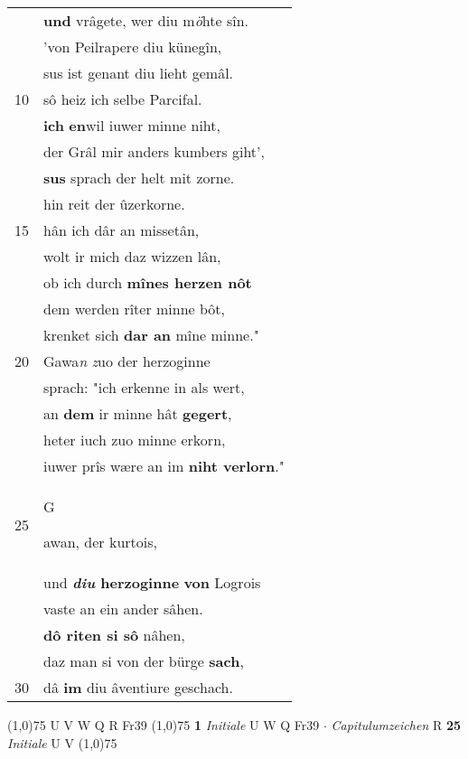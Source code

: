 \documentclass[8pt,a4paper,notitlepage]{article}
\begin{document}
\begin{table}[ht]
\begin{minipage}[t]{0.5\linewidth}
\begin{tabular}{rl}
 & \textbf{und} vrâgete, wer diu m\textit{ö}hte sîn.\\ 
 & 'von Peilrapere diu künegîn,\\ 
 & sus ist genant diu lieht gemâl.\\ 
10 & sô heiz ich selbe Parcifal.\\ 
 & \textbf{ich} \textbf{en}wil iuwer minne niht,\\ 
 & der Grâl mir anders kumbers giht',\\ 
 & \textbf{sus} sprach der helt mit zorne.\\ 
 & hin reit der ûzerkorne.\\ 
15 & hân ich dâr an missetân,\\ 
 & wolt ir mich daz wizzen lân,\\ 
 & ob ich durch \textbf{mînes herzen nôt}\\ 
 & dem werden rîter minne bôt,\\ 
 & krenket sich \textbf{dar an} mîne minne."\\ 
20 & Gawa\textit{n} \textit{z}uo der herzoginne\\ 
 & sprach: "ich erkenne in als wert,\\ 
 & an \textbf{dem} ir minne hât \textbf{gegert},\\ 
 & heter iuch zuo minne erkorn,\\ 
 & iuwer prîs wære an im \textbf{niht verlorn}."\\ 
25 & \begin{large}G\end{large}awan, der kurtois,\\ 
 & und \textbf{\textit{diu} herzoginne} \textbf{von} Logrois\\ 
 & vaste an ein ander sâhen.\\ 
 & \textbf{dô riten si sô} nâhen,\\ 
 & daz man si von der bürge \textbf{sach},\\ 
30 & dâ \textbf{im} diu âventiure geschach.\\ 
\end{tabular}
\scriptsize
\line(1,0){75} \newline
U V W Q R Fr39 \newline
\line(1,0){75} \newline
\textbf{1} \textit{Initiale} U W Q Fr39   $\cdot$ \textit{Capitulumzeichen} R  \textbf{25} \textit{Initiale} U V  \newline
\line(1,0){75} \newline

\end{minipage}
\end{table}
\end{document}
